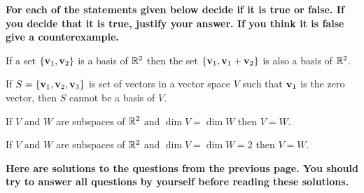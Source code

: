 \newpage

{\bf For each of the statements given below decide if it is true or false. If you decide that it is true, justify your answer. 
If you think it is false give a counterexample. }

\vskip 10mm

\benu
\item[\bf a)]  If a set $\{{\bf v}_{1}, {\bf v}_{2}\}$ is a basis of ${\mathbb R}^{2}$ then the set $\{ {\bf v}_{1}, {\bf v}_{1} + {\bf v}_{2}\}$
is also a basis of ${\mathbb R}^{2}$. 


\vskip 10mm


\item[\bf b)]  If  $S = \{ {\bf v}_{1}, {\bf v}_{2}, {\bf v}_{3}\}$ is set of vectors in a vector space $V$ such that 
${\bf v}_{1}$  is the zero vector, then  $S$ cannot be a basis of $V$. 


\vskip 10mm

\item[\bf c)]  If $V$ and $W$ are subspaces of ${\mathbb R}^{2}$ and $\dim V = \dim W$ then $V = W$. 


\vskip 10mm

\item[\bf d)]  If $V$ and $W$ are subspaces of ${\mathbb R}^{2}$ and $\dim V = \dim W = 2$ then $V = W$. 


\eenu


\newpage

{\bf Here are solutions to the questions from the previous page. You should try to answer all 
questions by yourself before reading these solutions.}

\vskip 5mm 

